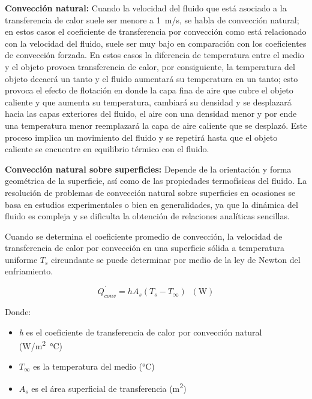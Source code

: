 \textbf{Convección natural:} Cuando la velocidad del fluido que está asociado a la transferencia de calor suele ser menore a \SI{1}{\meter/\second}, se habla de convección natural; en estos casos el coeficiente de transferencia por convección como está relacionado con la velocidad del fluido, suele ser muy bajo en comparación con los coeficientes de convección forzada. En estos casos  la diferencia de temperatura entre el medio y el objeto provoca transferencia de calor, por consiguiente, la temperatura del objeto decaerá un tanto y el fluido aumentará su temperatura en un tanto; esto provoca el efecto de flotación en donde la capa fina de aire que cubre el objeto caliente y que aumenta su temperatura, cambiará su densidad y se desplazará hacia las capas exteriores del fluido, el aire con una densidad menor y por ende una temperatura menor reemplazará la capa de aire caliente que se desplazó. Este proceso implica un movimiento del fluido y se repetirá hasta que el objeto caliente se encuentre en equilibrio térmico con el fluido. \cite{cengel}

\textbf{Convección natural sobre superficies:} Depende de la orientación y forma geométrica de la superficie, así como de las propiedades termofísicas del fluido. La resolución de problemas de convección natural sobre superficies en ocasiones se basa en estudios experimentales o bien en generalidades, ya que la dinámica del fluido es compleja y se dificulta la obtención de relaciones analíticas sencillas. \cite{cengel}

Cuando se determina el coeficiente promedio de convección, la velocidad de transferencia de calor por convección en una superficie sólida a temperatura uniforme $T_{s}$ circundante se puede determinar por medio de la ley de Newton del enfriamiento.\cite{cengel}

\begin{equation}\label{Newton}
    \dot{Q_{conv}}=hA_{s}(T_{s}-T_{\infty })\; \; (\si{\watt})
\end{equation}

Donde: 

\begin{itemize}
    \item \textit{h} es el coeficiente de transferencia de calor por convección natural (\si{\watt/\square\meter\celsius})
    \item $T_{\infty }$ es la temperatura del medio (\si{\celsius})
    \item$A_{s}$ es el área superficial de transferencia (\si{\square\meter})
\end{itemize}

